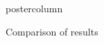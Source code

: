 \documentclass[final,hyperref={pdfpagelabels=false}]{beamer}
\newlength{\columnheight}
\begin{document}
\begin{frame}
\begin{columns}
\begin{column}{.49\paperwidth}
\begin{beamercolorbox}[center,wd=\textwidth]{postercolumn}
\begin{minipage}[T]{.99\textwidth} %
\parbox[t][\columnheight]{\textwidth}{ %
            



 

\begin{block}{Comparison of results}

\begin{columns}
\begin{column}{1\textwidth}

\centering

\centering
\begin{minipage}[t]{.95\textwidth}



\end{minipage}
\end{column}
\end{columns}
\end{block}}
\end{minipage}
\end{beamercolorbox}
\end{column}
\end{columns}
\end{frame}
\end{document}
